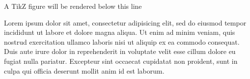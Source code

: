 \documentclass[class=article, crop=false]{standalone}
\begin{document}
A TikZ figure will be rendered below this line


Lorem ipsum dolor sit amet, consectetur adipisicing elit, sed do eiusmod tempor incididunt ut labore et dolore magna aliqua. Ut enim ad minim veniam, quis nostrud exercitation ullamco laboris nisi ut aliquip ex ea commodo consequat. Duis aute irure dolor in reprehenderit in voluptate velit esse cillum dolore eu fugiat nulla pariatur. Excepteur sint occaecat cupidatat non proident, sunt in culpa qui officia deserunt mollit anim id est laborum.
\end{document}
